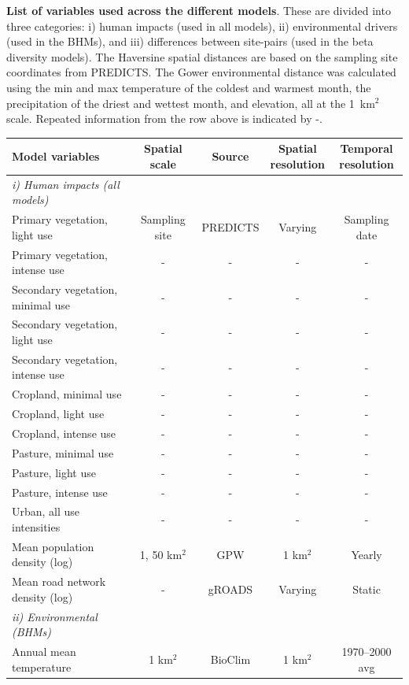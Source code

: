 \begin{extendedtable}[ht]
  \centering
  \caption{\textbf{List of variables used across the different models}. These are divided into three categories: i) human impacts (used in all models), ii) environmental drivers (used in the BHMs), and iii) differences between site-pairs (used in the beta diversity models). The Haversine spatial distances are based on the sampling site coordinates from PREDICTS. The Gower environmental distance was calculated using the min and max temperature of the coldest and warmest month, the precipitation of the driest and wettest month, and elevation, all at the 1~km$^2$ scale. Repeated information from the row above is indicated by -.}
  \small
  \setlength{\tabcolsep}{7pt}
  \begin{tabular}{lcccc}
  \toprule
  Model variables & Spatial scale & Source & \makecell{Spatial\\resolution} & \makecell{Temporal\\resolution} \\
  \midrule
  \textit{i) Human impacts (all models)} & & & & \\
  \midrule
  Primary vegetation, light use & Sampling site & PREDICTS & Varying & Sampling date \\
  Primary vegetation, intense use & - & - & - & - \\
  Secondary vegetation, minimal use & - & - & - & - \\
  Secondary vegetation, light use & - & - & - & - \\
  Secondary vegetation, intense use & - & - & - & - \\
  Cropland, minimal use & - & - & - & - \\
  Cropland, light use & - & - & - & - \\
  Cropland, intense use & - & - & - & - \\
  Pasture, minimal use & - & - & - & - \\
  Pasture, light use & - & - & - & - \\
  Pasture, intense use & - & - & - & - \\
  Urban, all use intensities & - & - & - & - \\
  Mean population density (log) & 1, 50 km$^2$ & GPW & 1 km$^2$ & Yearly \\
  Mean road network density (log) & - & gROADS & Varying & Static \\
  \midrule
  \textit{ii) Environmental (BHMs)} & & & & \\
  \midrule
  Annual mean temperature & 1 km$^2$ & BioClim & 1 km$^2$ & 1970--2000 avg \\

\end{tabular}
\end{extendedtable}
